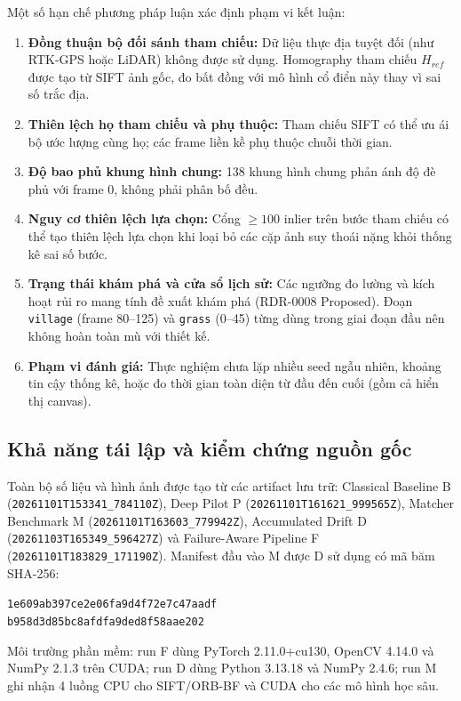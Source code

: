 \documentclass[conference]{IEEEtran}
\begin{document}
Một số hạn chế phương pháp luận xác định phạm vi kết luận:
\begin{enumerate}\setlength{\itemsep}{1.5pt}\setlength{\parskip}{0pt}
    \item \textbf{Đồng thuận bộ đối sánh tham chiếu:} Dữ liệu thực địa tuyệt đối (như RTK-GPS hoặc LiDAR) không được sử dụng. Homography tham chiếu $H_{ref}$ được tạo từ SIFT ảnh gốc, đo bất đồng với mô hình cổ điển này thay vì sai số trắc địa.
    \item \textbf{Thiên lệch họ tham chiếu và phụ thuộc:} Tham chiếu SIFT có thể ưu ái bộ ước lượng cùng họ; các frame liền kề phụ thuộc chuỗi thời gian.
    \item \textbf{Độ bao phủ khung hình chung:} 138 khung hình chung phản ánh độ đè phủ với frame 0, không phải phân bố đều.
    \item \textbf{Nguy cơ thiên lệch lựa chọn:} Cổng $\ge 100$ inlier trên bước tham chiếu có thể tạo thiên lệch lựa chọn khi loại bỏ các cặp ảnh suy thoái nặng khỏi thống kê sai số bước.
    \item \textbf{Trạng thái khám phá và cửa sổ lịch sử:} Các ngưỡng đo lường và kích hoạt rủi ro mang tính đề xuất khám phá (RDR-0008 Proposed). Đoạn \texttt{village} (frame 80--125) và \texttt{grass} (0--45) từng dùng trong giai đoạn đầu nên không hoàn toàn mù với thiết kế.
    \item \textbf{Phạm vi đánh giá:} Thực nghiệm chưa lặp nhiều seed ngẫu nhiên, khoảng tin cậy thống kê, hoặc đo thời gian toàn diện từ đầu đến cuối (gồm cả hiển thị canvas).
\end{enumerate}

\subsection{Khả năng tái lập và kiểm chứng nguồn gốc}
\label{subsec:reproducibility}

Toàn bộ số liệu và hình ảnh được tạo từ các artifact lưu trữ: Classical Baseline B (\nolinkurl{20261101T153341_784110Z}), Deep Pilot P (\nolinkurl{20261101T161621_999565Z}), Matcher Benchmark M (\nolinkurl{20261101T163603_779942Z}), Accumulated Drift D (\nolinkurl{20261103T165349_596427Z}) và Failure-Aware Pipeline F (\nolinkurl{20261101T183829_171190Z}). Manifest đầu vào M được D sử dụng có mã băm SHA-256:
\begin{center}
\footnotesize
\texttt{1e609ab397ce2e06fa9d4f72e7c47aadf}\\
\texttt{b958d3d85bc8afdfa9ded8f58aae202}
\end{center}
Môi trường phần mềm: run F dùng PyTorch 2.11.0+cu130, OpenCV 4.14.0 và NumPy 2.1.3 trên CUDA; run D dùng Python 3.13.18 và NumPy 2.4.6; run M ghi nhận 4 luồng CPU cho SIFT/ORB-BF và CUDA cho các mô hình học sâu.
\end{document}
